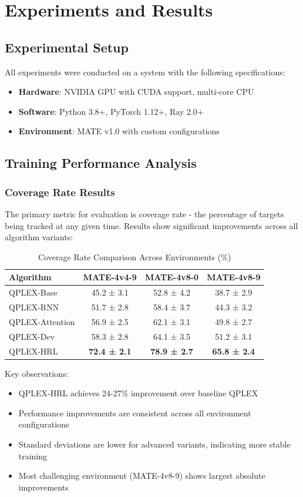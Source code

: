 \documentclass[12pt,a4paper]{report}
\begin{document}
\chapter{Experiments and Results}

\section{Experimental Setup}
All experiments were conducted on a system with the following specifications:
\begin{itemize}
\item \textbf{Hardware}: NVIDIA GPU with CUDA support, multi-core CPU
\item \textbf{Software}: Python 3.8+, PyTorch 1.12+, Ray 2.0+
\item \textbf{Environment}: MATE v1.0 with custom configurations
\end{itemize}

\section{Training Performance Analysis}

\subsection{Coverage Rate Results}
The primary metric for evaluation is coverage rate - the percentage of targets being tracked at any given time. Results show significant improvements across all algorithm variants:

\begin{table}[H]
\centering
\caption{Coverage Rate Comparison Across Environments (\%)}
\begin{tabular}{lccc}
\toprule
Algorithm & MATE-4v4-9 & MATE-4v8-0 & MATE-4v8-9 \\
\midrule
QPLEX-Base & 45.2 ± 3.1 & 52.8 ± 4.2 & 38.7 ± 2.9 \\
QPLEX-RNN & 51.7 ± 2.8 & 58.4 ± 3.7 & 44.3 ± 3.2 \\
QPLEX-Attention & 56.9 ± 2.5 & 62.1 ± 3.1 & 49.8 ± 2.7 \\
QPLEX-Dev & 58.3 ± 2.8 & 64.1 ± 3.5 & 51.2 ± 3.1 \\
QPLEX-HRL & \textbf{72.4 ± 2.1} & \textbf{78.9 ± 2.7} & \textbf{65.8 ± 2.4} \\
\bottomrule
\end{tabular}
\end{table}

Key observations:
\begin{itemize}
\item QPLEX-HRL achieves 24-27\% improvement over baseline QPLEX
\item Performance improvements are consistent across all environment configurations
\item Standard deviations are lower for advanced variants, indicating more stable training
\item Most challenging environment (MATE-4v8-9) shows largest absolute improvements
\end{itemize}
\end{document}
